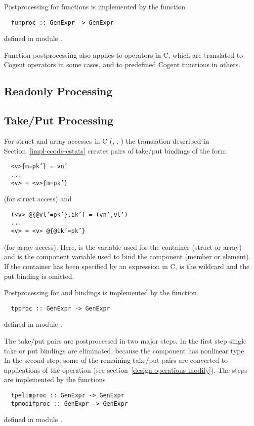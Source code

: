 Postprocessing for functions is implemented by the function
\begin{verbatim}
  funproc :: GenExpr -> GenExpr
\end{verbatim}
defined in module .

Function postprocessing also applies to operators in C, which are translated to Cogent operators in some cases, and to predefined
Cogent functions in others.

\subsection{Readonly Processing}
\label{impl-post-readonly}

\subsection{Take/Put Processing}
\label{impl-post-takeput}

For struct and array accesses in C (, , ) the translation described in Section~\ref{impl-ccode-cstats} 
creates pairs of take/put bindings of the form
\begin{verbatim}
  <v>{m=pk’} = vn’
  ...
  <v> = <v>{m=pk’}
\end{verbatim}
(for struct access) and
\begin{verbatim}
  (<v> @{@vl’=pk’},ik’) = (vn’,vl’)
  ...
  <v> = <v> @{@ik’=pk’}
\end{verbatim}
(for array access). Here,  is the variable used for the container (struct or array) and  is the component variable 
used to bind the component (member or element). If the container has been specified by an expression in C,  is the wildcard \code{\_}
and the put binding is omitted.

Postprocessing for  and  bindings is implemented by the function
\begin{verbatim}
  tpproc :: GenExpr -> GenExpr
\end{verbatim}
defined in module .

The take/put pairs are postprocessed in two major steps. In the first step single take or put bindings are eliminated, because the component
has nonlinear type. In the second step, some of the remaining take/put pairs are converted to applications of the  operation
(see section~\ref{design-operations-modify}). The steps are implemented by the functions
\begin{verbatim}
  tpelimproc :: GenExpr -> GenExpr
  tpmodifproc :: GenExpr -> GenExpr
\end{verbatim}
defined in module .

